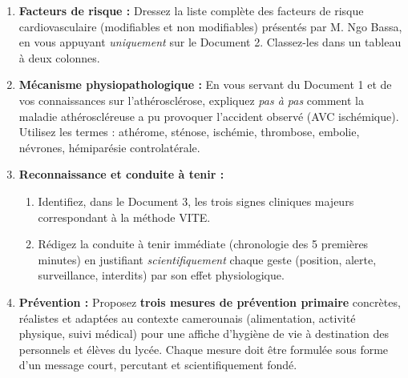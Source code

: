 \documentclass[11pt]{article}
\newcommand{\cle}[1]{{\popxbold\color{popdark}#1}}
\begin{document}
\begin{enumerate}
  \item \textbf{Facteurs de risque :} Dressez la liste complète des facteurs de risque cardiovasculaire (modifiables et non modifiables) présentés par M. Ngo Bassa, en vous appuyant \emph{uniquement} sur le Document 2. Classez-les dans un tableau à deux colonnes.
  \item \textbf{Mécanisme physiopathologique :} En vous servant du Document 1 et de vos connaissances sur l'athérosclérose, expliquez \emph{pas à pas} comment la maladie athéroscléreuse a pu provoquer l'accident observé (AVC ischémique). Utilisez les termes : \cle{athérome}, \cle{sténose}, \cle{ischémie}, \cle{thrombose}, \cle{embolie}, \cle{névrones}, \cle{hémiparésie controlatérale}.
  \item \textbf{Reconnaissance et conduite à tenir :} 
  \begin{enumerate}
    \item Identifiez, dans le Document 3, les trois signes cliniques majeurs correspondant à la méthode \cle{VITE}.
    \item Rédigez la conduite à tenir immédiate (chronologie des 5 premières minutes) en justifiant \emph{scientifiquement} chaque geste (position, alerte, surveillance, interdits) par son effet physiologique.
  \end{enumerate}
  \item \textbf{Prévention :} Proposez \textbf{trois mesures de prévention primaire} concrètes, réalistes et adaptées au contexte camerounais (alimentation, activité physique, suivi médical) pour une affiche d'hygiène de vie à destination des personnels et élèves du lycée. Chaque mesure doit être formulée sous forme d'un message court, percutant et scientifiquement fondé.
\end{enumerate}
\end{document}
